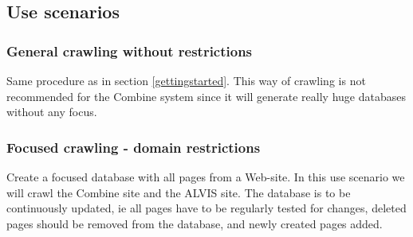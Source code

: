 \subsection{Use scenarios}
\subsubsection{General crawling without restrictions}
Same procedure as in section \ref{gettingstarted}. This way of
crawling is not recommended for the Combine system since it will
generate really huge databases without any focus.

\subsubsection{Focused crawling - domain restrictions}
Create a focused database with all pages from a Web-site. In this
use scenario we will crawl the Combine site and the ALVIS site.
The database is to be continuously updated, ie all pages have to be
regularly tested for changes, deleted pages should be removed from
the database, and newly created pages added.
